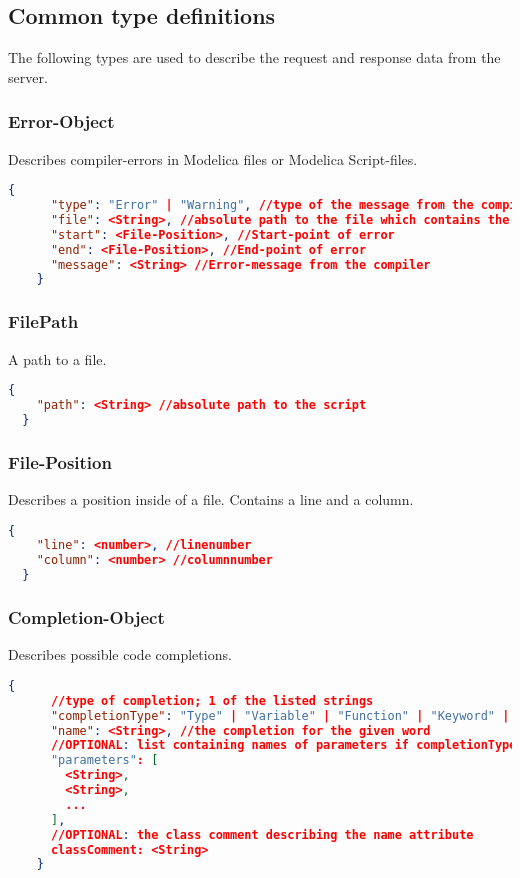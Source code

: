 \subsection{Common type definitions}
The following types are used to describe the request and response data
from the server.

\subsubsection{Error-Object}
Describes compiler-errors in Modelica files or Modelica Script-files.
\newline{}
  \begin{lstlisting}[basicstyle=\small,language=json]
    {
      "type": "Error" | "Warning", //type of the message from the compiler
      "file": <String>, //absolute path to the file which contains the error
      "start": <File-Position>, //Start-point of error
      "end": <File-Position>, //End-point of error
      "message": <String> //Error-message from the compiler
    }
  \end{lstlisting}

\subsubsection{FilePath}
A path to a file.
\newline{}
\begin{lstlisting}[basicstyle=\small,language=json]
  {
    "path": <String> //absolute path to the script
  }
\end{lstlisting}
  
\subsubsection{File-Position}
Describes a position inside of a file. Contains a
line and a column.
\newline{}
  \begin{lstlisting}[basicstyle=\small,language=json]
  {
    "line": <number>, //linenumber
    "column": <number> //columnnumber
  }
  \end{lstlisting}

  \subsubsection{Completion-Object}
  Describes possible code completions.
  \begin{lstlisting}[basicstyle=\small,language=json]
    {
      //type of completion; 1 of the listed strings
      "completionType": "Type" | "Variable" | "Function" | "Keyword" | "Package" | "Model" | "Class",
      "name": <String>, //the completion for the given word
      //OPTIONAL: list containing names of parameters if completionType=function
      "parameters": [
        <String>,
        <String>,
        ...
      ],
      //OPTIONAL: the class comment describing the name attribute
      classComment: <String>
    }
  \end{lstlisting}

